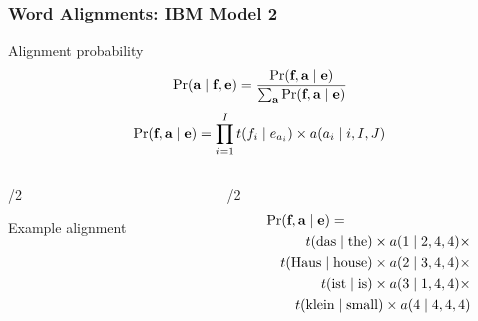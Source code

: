 \begin{frame}
\frametitle{Word Alignments: IBM Model 2}
\begin{block}{Alignment probability}
\[ \Pr(\textbf{a} \mid \textbf{f}, \textbf{e}) = \frac{ \Pr( \textbf{f}, \textbf{a} \mid \textbf{e} ) }{ \sum_{\textbf{a}} \Pr(\textbf{f}, \textbf{a} \mid \textbf{e}) } 
\]
\[ \Pr(\textbf{f}, \textbf{a} \mid \textbf{e}) = \prod_{i=1}^I t(f_i \mid e_{a_i}) \times a(a_i \mid i, I, J) \]
\end{block}\pause

\begin{columns}[t]

\begin{column}{\textwidth/2}
\begin{block}{Example alignment}


\end{block}
\end{column}\pause

\begin{column}{\textwidth/2}
{\small
\begin{eqnarray*}
\lefteqn{\Pr( \src, \aln \mid \tgt ) =}\\
&& t(\textrm{das} \mid \textrm{the}) \times a(1 \mid 2, 4, 4) \times \\
&& t(\textrm{Haus} \mid \textrm{house}) \times a(2 \mid 3, 4, 4) \times \\
&& t(\textrm{ist} \mid \textrm{is}) \times a(3 \mid 1, 4, 4) \times \\
&& t(\textrm{klein} \mid \textrm{small}) \times a(4 \mid 4, 4, 4)
\end{eqnarray*}
}
\end{column}

\end{columns}
\end{frame}

